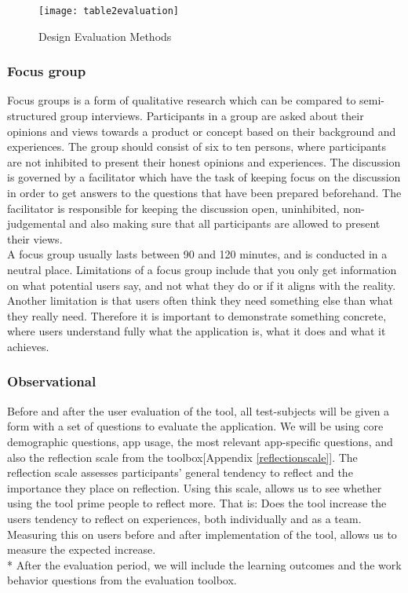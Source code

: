 \begin{figure}[H]
\centering
	\texttt{[image: table2evaluation]}
\caption{Design Evaluation Methods}
\label{table2evaluation}
\end{figure}

\subsubsection{Focus group}
Focus groups is a form of qualitative research which can be compared to semi-structured group interviews\citep{rogers2011interaction}. Participants in a group are asked about their opinions and views towards a product or concept based on their background and experiences\citep{krueger2008focus}. The group should consist of six to ten persons, where participants are not inhibited to present their honest opinions and experiences\citep{krueger2008focus}. The discussion is governed by a facilitator which have the task of keeping focus on the discussion in order to get answers to the questions that have been prepared beforehand\citep{krueger2008focus, nielsen1997use}. The facilitator is responsible for keeping the discussion open, uninhibited, non-judgemental and also making sure that all participants are allowed to present their views\citep{powell1996focus}. \\
A focus group usually lasts between 90 and 120 minutes, and is conducted in a neutral place. Limitations of a focus group include that you only get information on what potential users say, and not what they do or if it aligns with the reality\citep{nielsen1997use}. Another limitation is that users often think they need something else than what they really need. Therefore it is important to demonstrate something concrete, where users understand fully what the application is, what it does and what it achieves. 
 
\subsubsection{Observational}
Before and after the user evaluation of the tool, all test-subjects will be given a form with a set of questions to evaluate the application. We will be using core demographic questions, app usage, the most relevant app-specific questions, and also the reflection scale from the toolbox[Appendix \ref{reflectionscale}]. The reflection scale assesses participants' general tendency to reflect and the importance they place on reflection. Using this scale, allows us to see whether using the tool prime people to reflect more. That is: Does the tool increase the users tendency to reflect on experiences, both individually and as a team. Measuring this on users before and after implementation of the tool, allows us to measure the expected increase. \\*
After the evaluation period,  we will include the learning outcomes and the work behavior questions from the evaluation toolbox.


